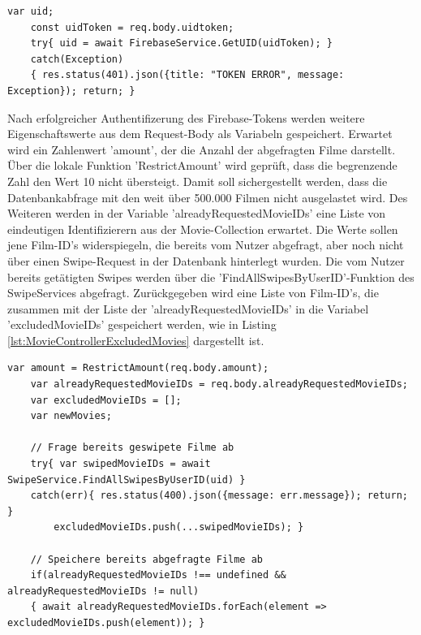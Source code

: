 \begin{lstlisting}[caption=Controller Firebase-Authentifizierung, label=lst:controllerfirebaseauth]
    var uid; 
    const uidToken = req.body.uidtoken;
    try{ uid = await FirebaseService.GetUID(uidToken); }
    catch(Exception)
    { res.status(401).json({title: "TOKEN ERROR", message: Exception}); return; }
\end{lstlisting}

\noindent
Nach erfolgreicher Authentifizerung des Firebase-Tokens werden weitere Eigenschaftswerte aus dem Request-Body als Variabeln gespeichert. Erwartet wird ein Zahlenwert 'amount', der die Anzahl der abgefragten Filme darstellt. Über die lokale Funktion 'RestrictAmount' wird geprüft, dass die begrenzende Zahl den Wert 10 nicht übersteigt. Damit soll sichergestellt werden, dass die Datenbankabfrage mit den weit über 500.000 Filmen nicht ausgelastet wird. Des Weiteren werden in der Variable 'alreadyRequestedMovieIDs' eine Liste von   eindeutigen Identifizierern aus der Movie-Collection erwartet. Die Werte sollen jene Film-ID's widerspiegeln, die bereits vom Nutzer abgefragt, aber noch nicht über einen Swipe-Request in der Datenbank hinterlegt wurden. Die vom Nutzer bereits getätigten Swipes werden über die 'FindAllSwipesByUserID'-Funktion des SwipeServices abgefragt. Zurück\-gegeben wird eine Liste von Film-ID's, die zusammen mit der Liste der 'alreadyRequestedMovieIDs' in die Variabel 'excludedMovieIDs' gespeichert werden, wie in Listing \ref{lst:MovieControllerExcludedMovies} dargestellt ist.\\

\begin{lstlisting}[caption=MovieController - RequestMovie - Excluded Movies, label=lst:MovieControllerExcludedMovies]
    var amount = RestrictAmount(req.body.amount);
    var alreadyRequestedMovieIDs = req.body.alreadyRequestedMovieIDs;
    var excludedMovieIDs = [];
    var newMovies;
    
    // Frage bereits geswipete Filme ab
    try{ var swipedMovieIDs = await SwipeService.FindAllSwipesByUserID(uid) }
    catch(err){ res.status(400).json({message: err.message}); return; }
        excludedMovieIDs.push(...swipedMovieIDs); }

    // Speichere bereits abgefragte Filme ab
    if(alreadyRequestedMovieIDs !== undefined && alreadyRequestedMovieIDs != null)
    { await alreadyRequestedMovieIDs.forEach(element => excludedMovieIDs.push(element)); }
\end{lstlisting}

